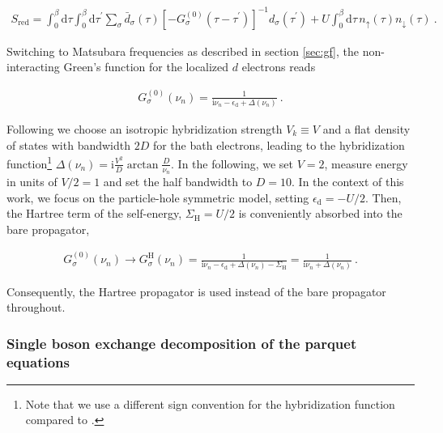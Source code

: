 \documentclass{SciPost}
\begin{document}
%
\begin{linenomath}
    \begin{align}
        S_{\mathrm{red}}=\int_0^\beta \mathrm{d} \tau \int_0^\beta \mathrm{d} \tau^{\prime} \sum_\sigma \bar{d}_\sigma(\tau)\left[-G_\sigma^{(0)}\left(\tau-\tau^{\prime}\right)\right]^{-1} d_\sigma\left(\tau^{\prime}\right)+U \int_0^\beta \mathrm{d} \tau\,  n_{\uparrow}(\tau) n_{\downarrow}(\tau)\ .
    \end{align}
\end{linenomath}
%
Switching to Matsubara frequencies as described in section \ref{sec:gf}, the non-interacting Green's function for the localized $d$ electrons reads
%
\begin{linenomath}
    \begin{align}
        G_\sigma^{(0)}\left(\nu_n\right)=\frac{1}{\mathrm{i} \nu_n-\epsilon_{\mathrm{d}}+ \Delta(\nu_n)}\ .
        \label{eq:G0_SIAM}
    \end{align}
\end{linenomath}
%
Following \cite{Chalupa2021} we choose an isotropic hybridization strength $V_k \equiv V$ and a flat density of states with bandwidth $2D$ for the bath electrons, leading to the hybridization function\footnote{ Note that we use a different sign convention for the hybridization function compared to \cite{Chalupa2021}.} \newline $\Delta(\nu_n) = \mathrm{i} \frac{V^2}{D} \arctan \frac{D}{\nu_n}$. In the following, we set $V=2$, measure energy in units of $V/2=1$ and set the half bandwidth to $D=10$. In the context of this work, we focus on the particle-hole symmetric model, setting $\epsilon_\mathrm{d}=-U/2$. Then, the Hartree term of the self-energy, $\Sigma_\mathrm{H}=U/2$ is conveniently absorbed into the bare propagator,
%
\begin{linenomath}
    \begin{align}
        G_\sigma^{(0)}(\nu_n) \rightarrow G_\sigma^{\mathrm{H}}(\nu_n) = \frac{1}{\mathrm{i} \nu_n-\epsilon_{\mathrm{d}}+ \Delta(\nu_n)  - \Sigma_\mathrm{H}} =  \frac{1}{\mathrm{i} \nu_n + \Delta(\nu_n) }\ .
    \end{align}
\end{linenomath}
%
Consequently, the Hartree propagator is used instead of the bare propagator throughout. 

\subsubsection{Single boson exchange decomposition of the parquet equations}
\label{subsec:SBE}
\end{document}
